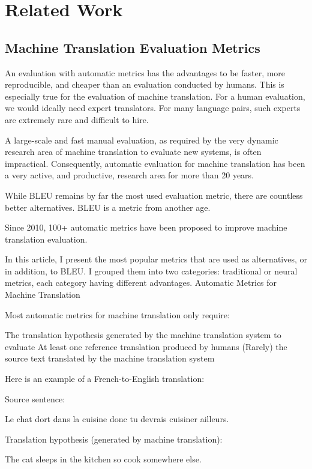 \chapter{Related Work}


\section{Machine Translation Evaluation Metrics}
An evaluation with automatic metrics has the advantages to be faster, more reproducible, and cheaper than an evaluation conducted by humans. This is especially true for the evaluation of machine translation. For a human evaluation, we would ideally need expert translators. For many language pairs, such experts are extremely rare and difficult to hire.

A large-scale and fast manual evaluation, as required by the very dynamic research area of machine translation to evaluate new systems, is often impractical. Consequently, automatic evaluation for machine translation has been a very active, and productive, research area for more than 20 years.

While BLEU remains by far the most used evaluation metric, there are countless better alternatives. BLEU is a metric from another age.

Since 2010, 100+ automatic metrics have been proposed to improve machine translation evaluation.

In this article, I present the most popular metrics that are used as alternatives, or in addition, to BLEU. I grouped them into two categories: traditional or neural metrics, each category having different advantages.
Automatic Metrics for Machine Translation

Most automatic metrics for machine translation only require:

    The translation hypothesis generated by the machine translation system to evaluate
    At least one reference translation produced by humans
    (Rarely) the source text translated by the machine translation system

Here is an example of a French-to-English translation:

    Source sentence:

Le chat dort dans la cuisine donc tu devrais cuisiner ailleurs.

    Translation hypothesis (generated by machine translation):

The cat sleeps in the kitchen so cook somewhere else.

